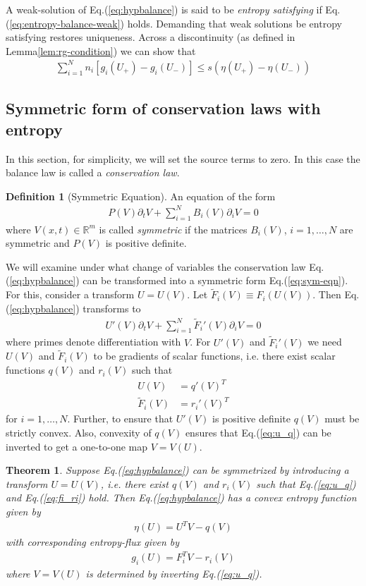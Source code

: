 \documentclass[11pt, reqno]{amsart}
\newcommand{\eqr}[1]{Eq.\thinspace(#1)}
\newcommand{\spfrac}[2]{{\partial_{#1}} {#2}}
\newtheorem{thm}{Theorem}
\theoremstyle{definition}
\newtheorem{dfn}{Definition}
\begin{document}
A weak-solution of \eqr{\ref{eq:hypbalance}} is said to be
\emph{entropy satisfying} if \eqr{\ref{eq:entropy-balance-weak}}
holds. Demanding that weak solutions be entropy satisfying restores
uniqueness. Across a discontinuity (as defined in
Lemma\thinspace\ref{lem:rg-condition}) we can show that
\begin{align}
  \sum_{i=1}^N 
  n_i[g_i(U_+) - g_i(U_-)] \le s\left(\eta(U_+) - \eta(U_-)\right)
\end{align}

\subsection{Symmetric form of conservation laws with entropy}

In this section, for simplicity, we will set the source terms to
zero. In this case the balance law is called a \emph{conservation
  law}.
\begin{dfn}[Symmetric Equation]
  An equation of the form
  \begin{align}
    P(V)\spfrac{t}{V} + \sum_{i=1}^N B_i(V)\spfrac{i}{V} = 0
    \label{eq:sym-eqn}
  \end{align}
  where $V(x,t) \in \mathbb{R}^m$ is called \emph{symmetric} if the
  matrices $B_i(V)$, $i=1,\ldots,N$ are symmetric and $P(V)$ is
  positive definite.
\end{dfn}
We will examine under what change of variables the conservation law
\eqr{\ref{eq:hypbalance}} can be transformed into a symmetric form
\eqr{\ref{eq:sym-eqn}}. For this, consider a transform $U =
U(V)$. Let $\tilde{F}_i(V) \equiv
F_i\left(U(V)\right)$. Then \eqr{\ref{eq:hypbalance}} transforms
to
\begin{align}
  U'(V) \spfrac{t}{V} + \sum_{i=1}^N 
  \tilde{F}_i'(V)
  \spfrac{i}{V}
  = 
  0
\end{align}
where primes denote differentiation with $V$. For $U'(V)$ and
$\tilde{F}_i'(V)$ we need $U(V)$ and $\tilde{F}_i(V)$ to be gradients
of scalar functions, i.e. there exist scalar functions $q(V)$ and
$r_i(V)$ such that
\begin{align}
  U(V) &= q'(V)^T  \label{eq:u_q} \\
  \tilde{F}_i(V) &= r_i'(V)^T \label{eq:fi_ri}
\end{align}
for $i=1,\ldots,N$. Further, to ensure that $U'(V)$ is positive
definite $q(V)$ must be strictly convex.  Also, convexity of $q(V)$
ensures that \eqr{\ref{eq:u_q}} can be inverted to get a one-to-one
map $V=V(U)$.
\begin{thm}
  Suppose \eqr{\ref{eq:hypbalance}} can be symmetrized by introducing
  a transform $U=U(V)$, i.e. there exist $q(V)$ and $r_i(V)$ such that
  \eqr{\ref{eq:u_q}} and \eqr{\ref{eq:fi_ri}} hold. Then
  \eqr{\ref{eq:hypbalance}} has a convex entropy function given by
  \begin{align}
    \eta(U) = U^TV - q(V)
  \end{align}
  with corresponding entropy-flux given by
  \begin{align}
    g_i(U) = F_i^TV - r_i(V)
  \end{align}
  where $V=V(U)$ is determined by inverting \eqr{\ref{eq:u_q}}.
\end{thm}
\end{document}
